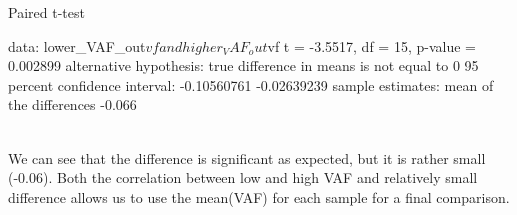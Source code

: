 \documentclass[a4paper,11pt]{article}
\begin{document}
\begin{Schunk}
\begin{Soutput}
	Paired t-test

data:  lower_VAF_out$vf and higher_VAF_out$vf
t = -3.5517, df = 15, p-value = 0.002899
alternative hypothesis: true difference in means is not equal to 0
95 percent confidence interval:
 -0.10560761 -0.02639239
sample estimates:
mean of the differences 
                 -0.066 
\end{Soutput}
\end{Schunk}
\\We can see that the difference is significant as expected, but it is rather small (-0.06). Both the correlation between low and high VAF and relatively small difference allows us to use the mean(VAF) for each sample for a final comparison.\\
\end{document}
